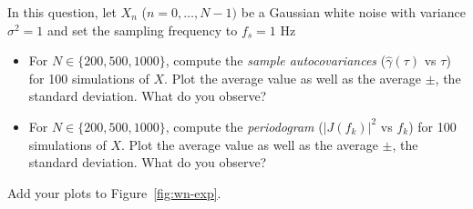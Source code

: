 \documentclass[11pt]{article}
\begin{document}
\begin{exercise}\label{ex:wn-exp}
    In this question, let $X_n$ ($n=0,\dots,N-1)$ be a Gaussian white noise with variance $\sigma^2=1$ and set the sampling frequency to $f_s=1$ Hz
    \begin{itemize}
        \item For $N\in\{200, 500, 1000\}$, compute the \textit{sample autocovariances} ($\hat{\gamma}(\tau)$ vs $\tau$) for 100 simulations of $X$.
        Plot the average value as well as the average $\pm$, the standard deviation.
        What do you observe?
        \item For $N\in\{200, 500, 1000\}$, compute the \textit{periodogram} ($|J(f_k)|^2$ vs $f_k$) for 100 simulations of $X$.
        Plot the average value as well as the average $\pm$, the standard deviation.
        What do you observe?
    \end{itemize}
    Add your plots to Figure~\ref{fig:wn-exp}.
    

\end{exercise}
\end{document}
